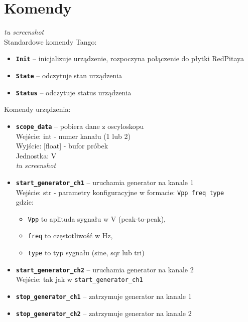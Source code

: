 \documentclass[12pt,a4paper]{article}
\begin{document}
	\section{Komendy}
	\emph{tu screenshot}\\
	Standardowe komendy Tango:
	\begin{itemize}
		\item \textbf{\texttt{Init}} -- inicjalizuje urządzenie, rozpoczyna połączenie do płytki RedPitaya
		\item \textbf{\texttt{State}} -- odczytuje stan urządzenia
		\item \textbf{\texttt{Status}} -- odczytuje status urządzenia
	\end{itemize}
	Komendy urządzenia:
	\begin{itemize}
		\item \textbf{\texttt{scope\_data}} -- pobiera dane z oscyloskopu\\
			  Wejście: int - numer kanału (1 lub 2)\\
			  Wyjście: [float] - bufor próbek\\
			  Jednostka: V\\
			  \emph{tu screenshot}
		\item \textbf{\texttt{start\_generator\_ch1}} -- uruchamia generator na kanale 1\\
			  Wejście: str - parametry konfiguracyjne w formacie: \texttt{Vpp freq type}\\
			  gdzie:
			  \begin{itemize}
			  	\item \texttt{Vpp} to aplituda sygnału w V (peak-to-peak),
			  	\item \texttt{freq} to częstotliwość w Hz,
			  	\item \texttt{type} to typ sygnału (sine, sqr lub tri)
			  \end{itemize}
		\item \textbf{\texttt{start\_generator\_ch2}} -- uruchamia generator na kanale 2\\
			  Wejście: tak jak w \texttt{start\_generator\_ch1}
		\item \textbf{\texttt{stop\_generator\_ch1}} -- zatrzymuje generator na kanale 1
		\item \textbf{\texttt{stop\_generator\_ch2}} -- zatrzymuje generator na kanale 2
	\end{itemize}
\end{document}
